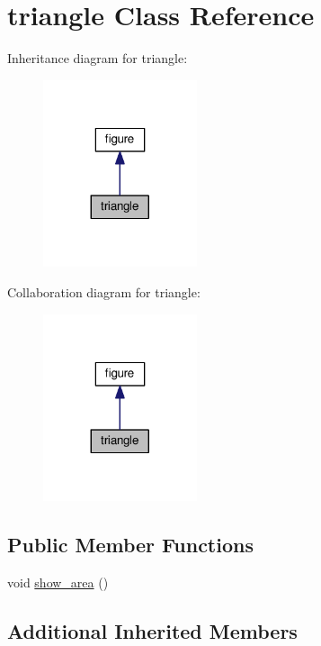 \hypertarget{classtriangle}{}\section{triangle Class Reference}
\label{classtriangle}


Inheritance diagram for triangle\+:
\nopagebreak
\begin{figure}[H]
\begin{center}
\leavevmode
\includegraphics[width=128pt]{classtriangle__inherit__graph}
\end{center}
\end{figure}


Collaboration diagram for triangle\+:
\nopagebreak
\begin{figure}[H]
\begin{center}
\leavevmode
\includegraphics[width=128pt]{classtriangle__coll__graph}
\end{center}
\end{figure}
\subsection*{Public Member Functions}
\begin{DoxyCompactItemize}
\item 
void \hyperlink{classtriangle_af73356d9e4f6099ca599051e886378ae}{show\+\_\+area} ()
\end{DoxyCompactItemize}
\subsection*{Additional Inherited Members}


